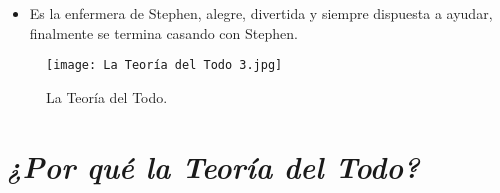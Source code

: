 \documentclass[a5paper, 11pt]{article}
\begin{document}
{\begin{itemize}
            \item {} Es la enfermera de Stephen, alegre, divertida y siempre dispuesta a ayudar, finalmente se termina casando con Stephen.
            
        \end{itemize}
        
        \begin{figure}[H]
            
            \raggedleft
            \caption*{La Teoría del Todo.}
            \texttt{[image: La Teoría del Todo 3.jpg]}
            
        \end{figure}
        
        }
        
        \newpage
    

\section{\emph{\large{¿Por qué la Teoría del Todo?}}}
\end{document}
